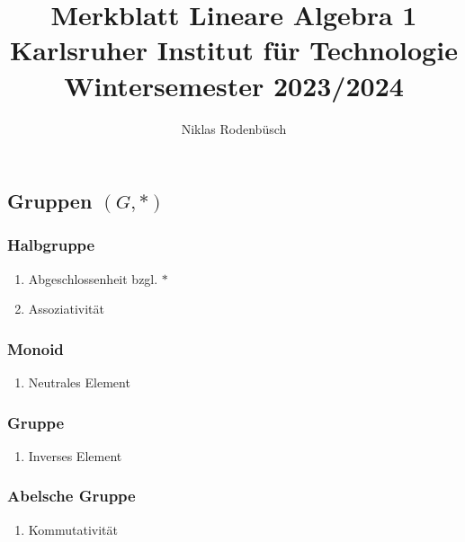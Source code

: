 \documentclass[ngerman,11pt,a4paper
,pdftex]{article}
\title{Merkblatt Lineare Algebra 1 \\[1ex] \large Karlsruher Institut für Technologie \\[1ex] Wintersemester 2023/2024}
\author{Niklas Rodenbüsch}
\date{}
\newcommand{\f}[1]{$#1$}
\theoremstyle{nodot}
\theoremstyle{nodot}
\begin{document}



        \begin{multicols*}{3}
          \begin{tcolorbox}[colback=white,bottom=10pt, top=10pt,bottom=10pt, top=10pt]
            \subsection*{Gruppen \f{(G,\ast )}}
            \subsubsection*{Halbgruppe}
            \begin{enumerate}
              \item Abgeschlossenheit bzgl. \f{\ast}
              \item Assoziativität
            \end{enumerate}
            \subsubsection*{Monoid}
            \begin{enumerate}
              \item[3.] Neutrales Element
            \end{enumerate}
            \subsubsection*{Gruppe}
            \begin{enumerate}
              \item[4.] Inverses Element
            \end{enumerate}
            \subsubsection*{Abelsche Gruppe}
            \begin{enumerate}
              \item Kommutativität
            \end{enumerate}


\end{tcolorbox}
\end{multicols*}
\end{document}

